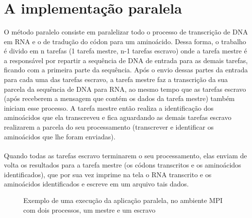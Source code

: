 \documentclass[a4paper,10pt]{article}
\begin{document}
\section{A implementação paralela}

\paragraph{}O método paralelo consiste em paralelizar todo o processo de transcrição de DNA em RNA e o de tradução do códon para um aminoácido. Dessa forma, o trabalho é divido em n tarefas (1 tarefa mestre, n-1 tarefas escravo) onde a tarefa mestre é a responsável por repartir a sequência de DNA de entrada para as demais tarefas, ficando com a primeira parte da sequência. Após o envio dessas partes da entrada para cada uma das tarefas escravo, a tarefa mestre faz a transcrição da sua parcela da sequência de DNA para RNA, ao mesmo tempo que as tarefas escravo (após receberem a mensagem que contém os dados da tarefa mestre) também iniciam esse processo. A tarefa mestre então realiza a identificação dos aminoácidos que ela transcreveu e fica aguardando as demais tarefas escravo realizarem a parcela do seu processamento (transcrever e identificar os aminoácidos que lhe foram enviadas).\\
\paragraph{}Quando todas as tarefas escravo terminarem o seu processamento, elas enviam de volta os resultados para a tarefa mestre (os códons transcritos e os aminoácidos identificados), que por sua vez imprime na tela o RNA transcrito e os aminoácidos identificados e escreve em um arquivo tais dados.

\begin{figure}[!htb]
\centering
{}
\quad
{}
\caption{Exemplo de uma execução da aplicação paralela, no ambiente MPI com dois processos, um mestre e um escravo}
\label{Figura 1}
\end{figure}
\end{document}
